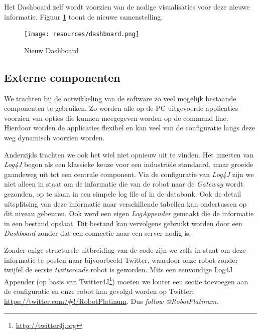 \documentclass[12pt,a4paper]{report}
\begin{document}
Het Dashboard zelf wordt voorzien van de nodige visualisaties voor deze nieuwe informatie. Figuur \ref{fig:dashboard} toont de nieuwe samenstelling.

\begin{figure}[htbp]
  \centering
  \texttt{[image: resources/dashboard.png]}
  \caption{Nieuw Dashboard}
  \label{fig:dashboard}
\end{figure}

\subsection{Externe componenten}

We trachten bij de ontwikkeling van de software zo veel mogelijk bestaande componenten te gebruiken. Zo worden alle op de PC uitgevoerde applicaties voorzien van opties die kunnen meegegeven worden op de command line. Hierdoor worden de applicaties flexibel en kan veel van de configuratie langs deze weg dynamisch voorzien worden.

Anderzijds trachten we ook het wiel niet opnieuw uit te vinden. Het inzetten van \emph{Log4J} begon als een klassieke keuze voor een industri\"ele standaard, maar groeide gaandeweg uit tot een centrale component. Via de configuratie van \emph{Log4J} zijn we niet alleen in staat om de informatie die van de robot naar de \emph{Gateway} wordt gezonden, op te slaan in een simpele log file of in de databank. Ook de detail uitsplitsing van deze informatie naar verschillende tabellen kan ondertussen op dit niveau gebeuren. Ook werd een eigen \emph{LogAppender} gemaakt die de informatie in een bestand opslaat. Dit bestand kan vervolgens gebruikt worden door een \emph{Dashboard} zonder dat een connectie naar een server nodig is.

Zonder enige structurele uitbreiding van de code zijn we zelfs in staat om deze informatie te posten naar bijvoorbeeld Twitter, waardoor onze robot zonder twijfel de eerste \emph{twitterende} robot is geworden. Mits een eenvoudige Log4J Appender (op basis van Twitter4J\footnote{\url{http://twitter4j.org}}) moeten we louter een sectie toevoegen aan de configuratie en onze robot kan gevolgd worden op Twitter: \url{https://twitter.com/\#!/RobotPlatinum}. Dus \emph{follow @RobotPlatinum}.
\end{document}
